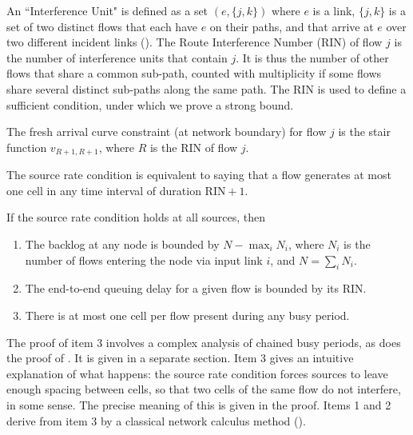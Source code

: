 An ``Interference Unit" is defined as a set $(e, \{j,k\})$ where
$e$ is a link, $\{j,k\}$ is a set of two distinct flows that each
have $e$ on their paths, and that arrive at $e$ over two different
incident links (). The Route Interference
Number (RIN) of flow $j$ is the number of interference units that
contain $j$. It is thus the number of other flows that share a
common sub-path, counted with multiplicity if some flows share
several distinct sub-paths along the same path. The RIN is used to
define a sufficient condition, under which we prove a strong
bound.

\begin{figure}[!htbp]
\end{figure}

\begin{definition}
The fresh arrival curve constraint (at network boundary) for flow
$j$ is the stair function $v_{R+1, R+1}$, where $R$ is the RIN of
flow $j$.
\end{definition}
The source rate condition is equivalent to saying that a flow
generates at most one cell in any time interval of duration
$\mathrm{RIN}+1$.

\begin{theorem}
 If the source rate condition holds at all
sources, then
\begin{enumerate}
  \item The backlog at any node is bounded by $N - \max_i N_i$,
  where $N_i$ is the number of flows entering the node via
  input link $i$, and $N=\sum_i N_i$.
   \item The end-to-end queuing delay for a given flow is bounded by its
   RIN.
  \item There is at most one cell per flow present during any
  busy period.
\end{enumerate}
\end{theorem}

The proof of item 3 involves a complex analysis of chained busy
periods, as does the proof of . It is given in a
separate section. Item 3 gives an intuitive explanation of what
happens: the source rate condition forces sources to leave enough
spacing between cells, so that two cells of the same flow do not
interfere, in some sense. The precise meaning of this is given in
the proof. Items 1 and 2 derive from item 3 by a classical network
calculus method ().

